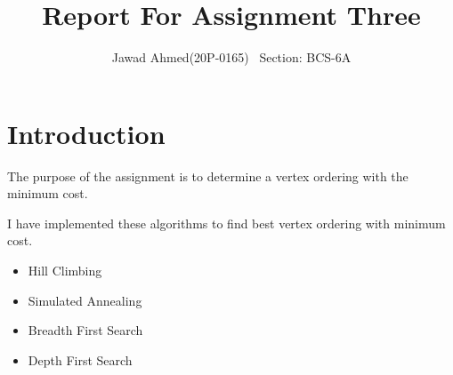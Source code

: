 \documentclass{article}
\title{Report For Assignment Three}
\author{Jawad Ahmed(20P-0165) \ Section: BCS-6A}
\begin{document}
\maketitle

\section{Introduction}

The purpose of the assignment is to determine a vertex ordering with the minimum cost.

I have implemented these algorithms to find best vertex ordering with minimum cost.
\begin{itemize}
\item Hill Climbing
\item Simulated Annealing
\item Breadth First Search
\item Depth First Search
\end{itemize}
\end{document}

